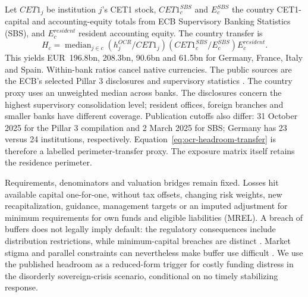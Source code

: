 Let $CET1_j$ be institution $j$'s CET1 stock, $CET1_c^{SBS}$ and $E_c^{SBS}$ the country CET1-capital and accounting-equity totals from ECB Supervisory Banking Statistics (SBS), and $E_c^{resident}$ resident accounting equity. The country transfer is
\begin{equation}
 H_c=\operatorname{median}_{j\in c}(h_j^{OCR}/CET1_j)
       (CET1_c^{SBS}/E_c^{SBS})E_c^{resident}.
 \label{eq:ocr-headroom-transfer}
\end{equation}
This yields EUR~196.8bn, 208.3bn, 90.6bn and 61.5bn for Germany, France, Italy and Spain. Within-bank ratios cancel native currencies. The public sources are the ECB's selected Pillar 3 disclosures and supervisory statistics \citep{ECBPublicCapital}. The country proxy uses an unweighted median across banks. The disclosures concern the highest supervisory consolidation level; resident offices, foreign branches and smaller banks have different coverage. Publication cutoffs also differ: 31 October 2025 for the Pillar 3 compilation and 2 March 2025 for SBS; Germany has 23 versus 24 institutions, respectively. Equation~\eqref{eq:ocr-headroom-transfer} is therefore a labelled perimeter-transfer proxy. The exposure matrix itself retains the residence perimeter.

Requirements, denominators and valuation bridges remain fixed. Losses hit available capital one-for-one, without tax offsets, changing risk weights, new recapitalization, guidance, management targets or an imputed adjustment for minimum requirements for own funds and eligible liabilities (MREL). A breach of buffers does not legally imply default: the regulatory consequences include distribution restrictions, while minimum-capital breaches are distinct \citep{ECBESRB2026}. Market stigma and parallel constraints can nevertheless make buffer use difficult \citep{ECBBuffer2023}. We use the published headroom as a reduced-form trigger for costly funding distress in the disorderly sovereign-crisis scenario, conditional on no timely stabilizing response.

